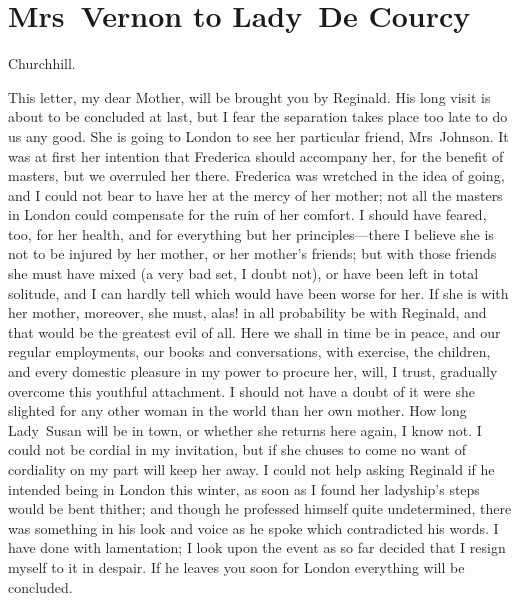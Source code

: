 \chapter{Mrs~Vernon to Lady~De Courcy}
  
  \begin{mail}{Churchhill.}{}

This letter, my dear Mother, will be brought you by Reginald. His long visit is about to be concluded at last, but I fear the separation takes place too late to do us any good. She is going to London to see her particular friend, Mrs~Johnson. It was at first her intention that Frederica should accompany her, for the benefit of masters, but we overruled her there. Frederica was wretched in the idea of going, and I could not bear to have her at the mercy of her mother; not all the masters in London could compensate for the ruin of her comfort. I should have feared, too, for her health, and for everything but her principles—there I believe she is not to be injured by her mother, or her mother's friends; but with those friends she must have mixed (a very bad set, I doubt not), or have been left in total solitude, and I can hardly tell which would have been worse for her. If she is with her mother, moreover, she must, alas! in all probability be with Reginald, and that would be the greatest evil of all. Here we shall in time be in peace, and our regular employments, our books and conversations, with exercise, the children, and every domestic pleasure in my power to procure her, will, I trust, gradually overcome this youthful attachment. I should not have a doubt of it were she slighted for any other woman in the world than her own mother. How long Lady~Susan will be in town, or whether she returns here again, I know not. I could not be cordial in my invitation, but if she chuses to come no want of cordiality on my part will keep her away. I could not help asking Reginald if he intended being in London this winter, as soon as I found her ladyship's steps would be bent thither; and though he professed himself quite undetermined, there was something in his look and voice as he spoke which contradicted his words. I have done with lamentation; I look upon the event as so far decided that I resign myself to it in despair. If he leaves you soon for London everything will be concluded. 

\end{mail}